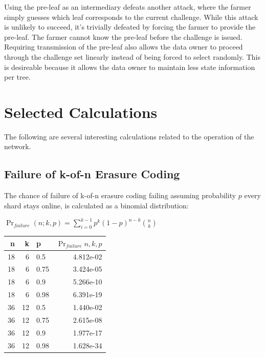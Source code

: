 \documentclass[a4paper,10pt]{article}
\begin{document}
Using the pre-leaf as an intermediary defeats another attack, where the farmer simply guesses which leaf corresponds to the current challenge. While this attack is unlikely to succeed, it’s trivially defeated by forcing the farmer to provide the pre-leaf. The farmer cannot know the pre-leaf before the challenge is issued. Requiring transmission of the pre-leaf also allows the data owner to proceed through the challenge set linearly instead of being forced to select randomly. This is desireable because it allows the data owner to maintain less state information per tree.

\section{Selected Calculations}
The following are several interesting calculations related to the operation of the network.

\subsection{Failure of k-of-n Erasure Coding}
The chance of failure of k-of-n erasure coding failing assuming probability $ p $ every shard stays online, is calculated as a binomial distribution:

{\centering
$\Pr_{failure}(n; k,p) = \displaystyle \sum_{i=0}^{k-1} p^{k}(1-p)^{n-k }{n \choose k}$
\\}

\begin{table}[hbt!]
\begin{center}
\begin{tabular}{r r l r}
n & k & p & $\Pr_{failure}{n,k,p}$\\
\hline  18 & 6  &  0.5  & 4.812e-02\\
\hline  18 & 6  &  0.75 &3.424e-05\\
\hline  18 & 6  &  0.9  & 5.266e-10\\
\hline  18 & 6  &  0.98 &6.391e-19\\
\hline  36 & 12 &  0.5  &1.440e-02\\
\hline  36 & 12 &  0.75 &2.615e-08\\
\hline  36 & 12 &  0.9  &1.977e-17\\
\hline  36 & 12 &  0.98 &1.628e-34\\
\end{tabular}
\end{center}
\end{table}
\end{document}
